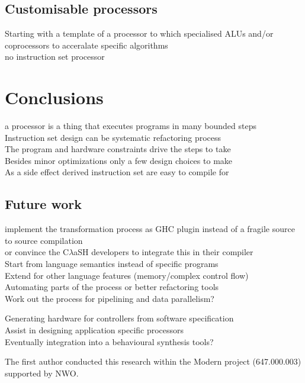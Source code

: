 \documentclass[preprint]{sigplanconf}
\def\clash{C$\lambda$aSH\xspace}
\begin{document}
\subsection{Customisable processors}
Starting with a template of a processor to which specialised ALUs and/or coprocessors to acceralate specific algorithms \\
no instruction set processor 

\section{Conclusions}

a processor is a thing that executes programs in many bounded steps \\

Instruction set design can be systematic refactoring process \\
The program and hardware constraints drive the steps to take \\
Besides minor optimizations only a few design choices to make \\
As a side effect derived instruction set are easy to compile for


\subsection{Future work}
implement the transformation process as GHC plugin instead of a fragile source to source compilation \\
or convince the \clash developers to integrate this in their compiler\\

Start from language semantics instead of specific programs \\
Extend for other language features (memory/complex control flow) \\
Automating parts of the process or better refactoring tools\\
Work out the process for pipelining and data parallelism? 

Generating hardware for controllers from software specification \\
Assist in designing application specific processors \\
Eventually integration into a behavioural synthesis tools?



\begin{acks}
The first author conducted this research within the Modern project (647.000.003) supported by NWO.
\end{acks}


\end{document}
